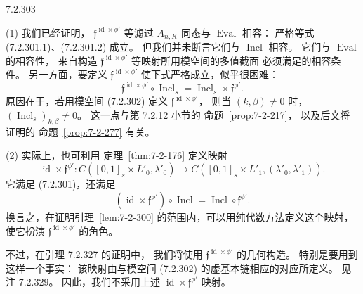 
\begin{remark}{7.2.303}\label{rem:7-2-303}
\par\noindent\textup{(1)}
我们已经证明，
$\mathfrak f^{\operatorname{id}\times\phi'}$
等滤过 $A_{n,K}$ 同态与
$\operatorname{Eval}$ 相容：
严格等式 (7.2.301.1)、(7.2.301.2) 成立。
但我们并未断言它们与
$\operatorname{Incl}$ 相容。
它们与 $\operatorname{Eval}$ 的相容性，
来自构造
$\mathfrak f^{\operatorname{id}\times\phi'}$
等映射所用模空间的多值截面
必须满足的相容条件。
另一方面，要定义
$\mathfrak f^{\operatorname{id}\times\phi'}$
使下式严格成立，似乎很困难：
\[
\mathfrak f^{\operatorname{id}\times\phi'}
\circ\operatorname{Incl}_s
=\operatorname{Incl}_s\times\mathfrak f^{\phi'}.
\]
原因在于，若用模空间 (7.2.302)
定义 $\mathfrak f^{\operatorname{id}\times\phi'}$，
则当 $(k,\beta)\neq0$ 时，
$(\operatorname{Incl}_s)_{k,\beta}\neq0$。
这一点与第 7.2.12 小节的
命题~\ref{prop:7-2-217}，
以及后文将证明的
命题~\ref{prop:7-2-277} 有关。

\par\noindent\textup{(2)}
实际上，也可利用
定理~\ref{thm:7-2-176}
定义映射
\[
\operatorname{id}\times\mathfrak f^{\phi'}\colon
C([0,1]_s\times L'_0,\lambda'_0)
\longrightarrow
C([0,1]_s\times L'_1,(\lambda'_0,\lambda'_1)).
\]
它满足 (7.2.301)，还满足
\[
(\operatorname{id}\times\mathfrak f^{\phi'})
\circ\operatorname{Incl}
=\operatorname{Incl}\circ\mathfrak f^{\phi'}.
\]
换言之，在证明引理~\ref{lem:7-2-300}
的范围内，可以用纯代数方法定义这个映射，
使它扮演
$\mathfrak f^{\operatorname{id}\times\phi'}$
的角色。

不过，在引理 7.2.327 的证明中，
我们将使用
$\mathfrak f^{\operatorname{id}\times\phi'}$
的几何构造。
特别是要用到这样一个事实：
该映射由与模空间 (7.2.302)
的虚基本链相应的对应所定义。
见注 7.2.329。
因此，我们不采用上述
$\operatorname{id}\times\mathfrak f^{\phi'}$
映射。
\end{remark}
